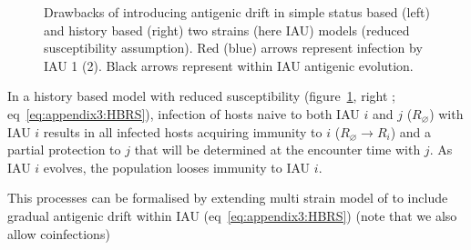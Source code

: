 \begin{figure}[h!]
\begin{minipage}{0.45\linewidth}
\end{minipage}
\caption{Drawbacks of introducing antigenic drift in simple status
  based (left) and history based (right) two strains (here IAU) models
  (reduced susceptibility assumption). Red (blue) arrows represent
  infection by IAU 1 (2). Black arrows represent within IAU antigenic
  evolution.}
\label{fig:drawbacks}
\end{figure}

In a history based model with reduced susceptibility
(figure~\ref{fig:drawbacks}, right ; eq~\eqref{eq:appendix3:HBRS}),
infection of hosts naive to both IAU $i$ and $j$ ($R_\varnothing$)
with IAU $i$ results in all infected hosts acquiring immunity to $i$
($R_\varnothing \rightarrow R_i$) and a partial protection to $j$ that
will be determined at the encounter time with $j$. As IAU $i$ evolves,
the population looses immunity to IAU $i$.

This processes can be formalised by extending multi strain model of
\cite{Andreasen1997} to include gradual antigenic drift within IAU
(eq~\eqref{eq:appendix3:HBRS}) (note that we also allow coinfections)

